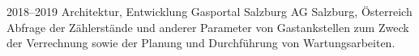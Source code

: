 \cventry
{2018--2019}
{Architektur, Entwicklung}
{Gasportal}
{Salzburg AG}
{Salzburg, Österreich}
{
  Abfrage der Zählerstände und anderer Parameter von Gastankstellen
  zum Zweck der Verrechnung sowie der Planung und Durchführung von Wartungsarbeiten.
}

